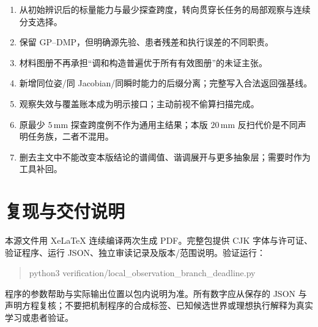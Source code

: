 \documentclass[11pt,a4paper]{article}
\theoremstyle{cn}
\newcommand{\mm}{\,\mathrm{mm}}
\begin{document}
\begin{enumerate}
\item 从初始辨识后的标量能力与最少探查跨度，转向贯穿长任务的局部观察与连续分支选择。
\item 保留 GP--DMP，但明确源先验、患者残差和执行误差的不同职责。
\item 材料图册不再承担“调和构造普遍优于所有有效图册”的未证主张。
\item 新增同位姿/同 Jacobian/同瞬时能力的后缀分离；完整写入合法返回强基线。
\item 观察失效与覆盖账本成为明示接口；主动前视不偷算扫描完成。
\item 原最少 \(5\mm\) 探查跨度例不作为通用主结果；本版 \(20\mm\) 反扫代价是不同声明任务族，二者不混用。
\item 删去主文中不能改变本版结论的谱阈值、谐调展开与更多抽象层；需要时作为工具补回。
\end{enumerate}

\section{复现与交付说明}
\label{app:reproduce}

本源文件用 XeLaTeX 连续编译两次生成 PDF。完整包提供 CJK 字体与许可证、验证程序、运行 JSON、独立审读记录及版本/范围说明。验证运行：
\begin{quote}
\ttfamily python3 verification/local\_observation\_branch\_deadline.py
\end{quote}
程序的参数帮助与实际输出位置以包内说明为准。所有数字应从保存的 JSON 与声明方程复核；不要把机制程序的合成标签、已知候选世界或理想执行解释为真实学习或患者验证。
\end{document}
